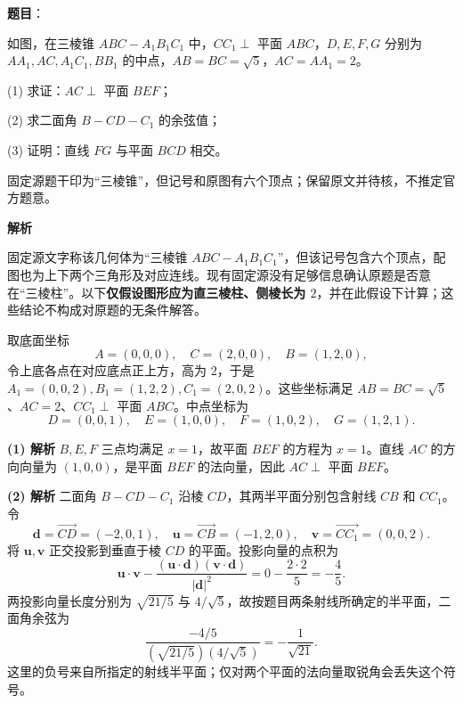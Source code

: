 \begin{answer}

\textbf{题目}：

如图，在三棱锥 $ABC-A_1B_1C_1$ 中，$CC_1\perp$ 平面 $ABC$，$D,E,F,G$ 分别为 $AA_1,AC,A_1C_1,BB_1$ 的中点，$AB=BC=\sqrt5$，$AC=AA_1=2$。

(1) 求证：$AC\perp$ 平面 $BEF$；

(2) 求二面角 $B-CD-C_1$ 的余弦值；

(3) 证明：直线 $FG$ 与平面 $BCD$ 相交。
\nopagebreak[4]
\begin{center}\end{center}
\nopagebreak[4]
\begin{gktip}
固定源题干印为“三棱锥”，但记号和原图有六个顶点；保留原文并待核，不推定官方题意。
\end{gktip}

\textbf{解析}

固定源文字称该几何体为“三棱锥 $ABC-A_1B_1C_1$”，但该记号包含六个顶点，配图也为上下两个三角形及对应连线。现有固定源没有足够信息确认原题是否意在“三棱柱”。以下\textbf{仅假设图形应为直三棱柱、侧棱长为 $2$}，并在此假设下计算；这些结论不构成对原题的无条件解答。

取底面坐标
\nopagebreak[4]
\[
A=(0,0,0),\quad C=(2,0,0),\quad B=(1,2,0),
\]
令上底各点在对应底点正上方，高为 $2$，于是 $A_1=(0,0,2),B_1=(1,2,2),C_1=(2,0,2)$。这些坐标满足 $AB=BC=\sqrt5$、$AC=2$、$CC_1\perp$ 平面 $ABC$。中点坐标为
\nopagebreak[4]
\[
D=(0,0,1),\quad E=(1,0,0),\quad F=(1,0,2),\quad G=(1,2,1).
\]

\textbf{(1) 解析} $B,E,F$ 三点均满足 $x=1$，故平面 $BEF$ 的方程为 $x=1$。直线 $AC$ 的方向向量为 $(1,0,0)$，是平面 $BEF$ 的法向量，因此 $AC\perp$ 平面 $BEF$。

\textbf{(2) 解析} 二面角 $B-CD-C_1$ 沿棱 $CD$，其两半平面分别包含射线 $CB$ 和 $CC_1$。令
\nopagebreak[4]
\[
\boldsymbol d=\overrightarrow{CD}=(-2,0,1),\quad
\boldsymbol u=\overrightarrow{CB}=(-1,2,0),\quad
\boldsymbol v=\overrightarrow{CC_1}=(0,0,2).
\]
将 $\boldsymbol u,\boldsymbol v$ 正交投影到垂直于棱 $CD$ 的平面。投影向量的点积为
\nopagebreak[4]
\[
\boldsymbol u\cdot\boldsymbol v-
\frac{(\boldsymbol u\cdot\boldsymbol d)(\boldsymbol v\cdot\boldsymbol d)}{|\boldsymbol d|^2}
=0-\frac{2\cdot2}{5}=-\frac45.
\]
两投影向量长度分别为 $\sqrt{21/5}$ 与 $4/\sqrt5$，故按题目两条射线所确定的半平面，二面角余弦为
\nopagebreak[4]
\[
\frac{-4/5}{(\sqrt{21/5})(4/\sqrt5)}=-\frac1{\sqrt{21}}.
\]
这里的负号来自所指定的射线半平面；仅对两个平面的法向量取锐角会丢失这个符号。


\end{answer}
